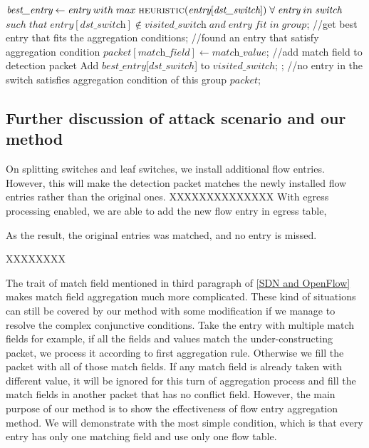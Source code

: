 \begin {tcolorbox}[blanker,float=tbp,
grow to left by=1cm, grow to right by=1cm]
\begin{algorithm}[H]
  \begin{algorithmic}[1]
      \State $\textit{best\_entry} \gets \textit{entry}\;with\;max\; \Call{heuristic}{\textit{entry}[\textit{dst\_switch}]}\;\forall\;\textit{entry}\;in\;\textit{switch}$
      \State $such\;that\;\textit{entry}[\textit{dst\_switch}] \notin \textit{visited\_switch}\;and\;\textit{entry}\;fit\;in\;group$;  //get best entry that fits the aggregation conditions;
        //found an entry that satisfy aggregation condition
        \State $\textit{packet}[\textit{match\_field}] \gets \textit{match\_value}$;  //add match field to detection packet
        \State Add $best\_entry$[$dst\_switch$] to $visited\_switch$;
        \State \Return {};  //no entry in the switch satisfies aggregation condition of this group
      \EndIf
      \State \Return $packet$;
    \EndFunction
  \end{algorithmic}
\end{algorithm}
\end{tcolorbox}


\subsection{Further discussion of attack scenario and our method}
\label{Further_discussion}
On splitting switches and leaf switches, we install additional flow entries. However, this will make the detection packet matches the newly installed flow entries rather than the original ones. XXXXXXXXXXXXXX
With egress processing enabled, we are able to add the new flow entry in egress table, 


As the result, the original entries was matched, and no entry is missed. 


XXXXXXXX\cite{OF_SPEC_15}

The trait of match field mentioned in third paragraph of \ref{SDN and OpenFlow} makes match field aggregation much more complicated. These kind of situations can still be covered by our method with some modification if we manage to resolve the complex conjunctive conditions. Take the entry with multiple match fields for example, if all the fields and values match the under-constructing packet, we process it according to first aggregation rule. Otherwise we fill the packet with all of those match fields. If any match field is already taken with different value, it will be ignored for this turn of aggregation process and fill the match fields in another packet that has no conflict field. However, the main purpose of our method is to show the effectiveness of flow entry aggregation method. We will demonstrate with the most simple condition, which is that every entry has only one matching field and use only one flow table.

